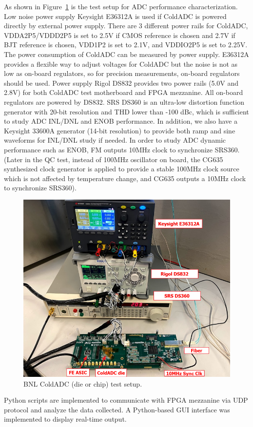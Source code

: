 As shown in Figure~\ref{fig:bnl_testsetup} is the test setup for ADC performance characterization. Low noise power supply Keysight E36312A is used if ColdADC is powered directly by external power supply. There are 3 different power rails for ColdADC, VDDA2P5/VDDD2P5 is set to 2.5V if CMOS reference is chosen and 2.7V if BJT reference is chosen, VDD1P2 is set to 2.1V, and VDDIO2P5 is set to 2.25V. The power consumption of ColdADC can be measured by power supply. E36312A provides a flexible way to adjust voltages for ColdADC but the noise is not as low as on-board regulators, so for precision measurements, on-board regulators should be used. Power supply Rigol DS832 provides two power rails (5.0V and 2.8V) for both ColdADC test motherboard and FPGA mezzanine. All on-board regulators are powered by DS832. SRS DS360 is an ultra-low distortion function generator with 20-bit resolution and THD lower than -100 dBc, which is sufficient to study ADC INL/DNL and ENOB performance. In addition, we also have a Keysight 33600A generator (14-bit resolution) to provide both ramp and sine waveforms for INL/DNL study if needed. In order to study ADC dynamic performance such as ENOB, FM outputs 10MHz clock to synchronize SRS360. (Later in the QC test, instead of 100MHz oscillator on board, the CG635 synthesized clock generator is applied to provide a stable 100MHz clock source which is not affected by temperature change, and CG635 outputs a 10MHz clock to synchronize SRS360). 
\begin{figure}[!ht]
\centering
 \includegraphics[width=0.75\linewidth]{figures/BNL_testsetup.png}
  \caption{BNL ColdADC (die or chip) test setup.}
  \label{fig:bnl_testsetup}
\end{figure}
Python scripts are implemented to communicate with FPGA mezzanine via UDP protocol and analyze the data collected. A Python-based GUI interface was implemented to display real-time output.
